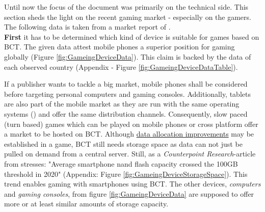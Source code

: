 Until now the focus of the document was primarily on the technical side.
This section sheds the light on the recent gaming market - especially on the gamers.
The following data is taken from a market report of \citet{LimelightNetworks.2020}. \\
\textbf{First} it has to be determined which kind of device is suitable for games based on \gls{BCT}.
The given data \cite[7]{LimelightNetworks.2020} attest mobile phones a superior position for gaming globally (Figure \ref{fig:GameingDeviceData}).
This claim is backed by the data of each observed country (Appendix - Figure \ref{fig:GameingDeviceDataTable}).
\begin{figure}
\end{figure}
If a publisher wants to tackle a big market, mobile phones shall be considered before targeting personal computers and gaming consoles.
Additionally, tablets are also part of the mobile market as they are run with the same operating systems (\citet{statista.com.2021b}) and offer the same distribution channels.
Consequently, slow paced (turn based) games which can be played on mobile phones
or cross platform offer a market to be hosted on \gls{BCT}.
Although \hyperref[sec:DataAllocationImprovements]{data allocation improvements} may be established in a game,
\gls{BCT} still needs storage space \cite[81]{Besancon.2019} as data can not just be pulled on demand from a central server.
Still, as a \textit{Counterpoint Research}-article from \cite{Wang.2021} stresses:
"Average smartphone nand flash capacity crossed the 100GB threshold in 2020"
(Appendix: Figure \ref{fig:GameingDeviceStorageSpace}).
This trend enables gaming with smartphones using \gls{BCT}.
The other devices, \textit{computers} and \textit{gaming consoles}, from figure \ref{fig:GameingDeviceData} are supposed to offer more or at least similar amounts of storage capacity. \\
